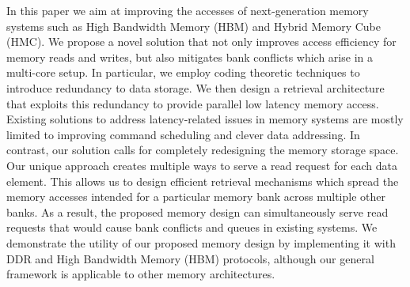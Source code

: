 In this paper we aim at improving the accesses of next-generation memory systems such as High Bandwidth Memory (HBM) and Hybrid Memory Cube (HMC). We propose a novel solution that not only improves access efficiency for memory reads and writes, but also mitigates bank conflicts which arise in a multi-core setup. In particular, we employ coding theoretic techniques to introduce redundancy to data storage. We then design a retrieval architecture that exploits this redundancy to provide parallel low latency memory access. Existing solutions to address latency-related issues in memory systems are mostly limited to improving command scheduling and clever data addressing. In contrast, our solution calls for completely redesigning the memory storage space. Our unique approach creates multiple ways to serve a read request for each data element. This allows us to design efficient retrieval mechanisms which spread the memory accesses intended for a particular memory bank across multiple other banks. As a result, the proposed memory design can simultaneously serve read requests that would cause bank conflicts and queues in existing systems. We demonstrate the utility of our proposed memory design by implementing it with DDR and High Bandwidth Memory (HBM) protocols, although our general framework is applicable to other memory architectures. 



